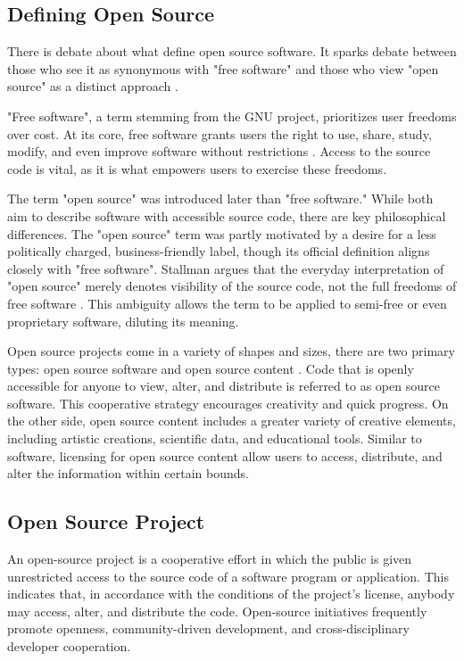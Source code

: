 \subsection{Defining Open Source}
There is debate about what define open source software. It sparks debate between those who see it as synonymous with "free software" and those who view "open source" as a distinct approach \cite{FuggettaAlfonso2003Osse}.

"Free software", a term stemming from the GNU project, prioritizes user freedoms over cost. At its core, free software grants users the right to use, share, study, modify, and even improve software without restrictions \cite{Whatisfreesoftware}.  Access to the source code is vital, as it is what empowers users to exercise these freedoms.

The term "open source" was introduced later than "free software." While both aim to describe software with accessible source code, there are key philosophical differences. The "open source" term was partly motivated by a desire for a less politically charged, business-friendly label, though its official definition aligns closely with "free software". Stallman argues that the everyday interpretation of "open source" merely denotes visibility of the source code, not the full freedoms of free software \cite{StallmanWhyOpenSource}. This ambiguity allows the term to be applied to semi-free or even proprietary software, diluting its meaning.


Open source projects come in a variety of shapes and sizes, there are two primary types: open source software and open source content \cite{OregShaul2008Emfc}. Code that is openly accessible for anyone to view, alter, and distribute is referred to as open source software. This cooperative strategy encourages creativity and quick progress. On the other side, open source content includes a greater variety of creative elements, including artistic creations, scientific data, and educational tools. Similar to software, licensing for open source content allow users to access, distribute, and alter the information within certain bounds.

\subsection{Open Source Project}
An open-source project is a cooperative effort in which the public is given unrestricted access to the source code of a software program or application. This indicates that, in accordance with the conditions of the project's license, anybody may access, alter, and distribute the code. Open-source initiatives frequently promote openness, community-driven development, and cross-disciplinary developer cooperation.

